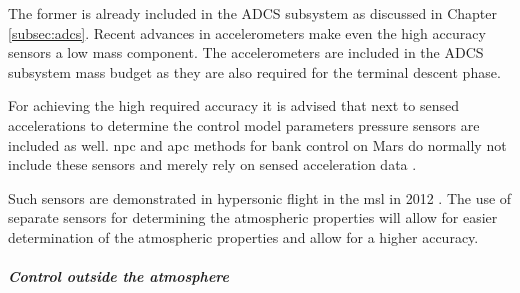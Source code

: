 The former is already included in the ADCS subsystem as discussed in Chapter \ref{subsec:adcs}. Recent advances in accelerometers make even the high accuracy sensors a low mass component. The accelerometers are included in the ADCS subsystem mass budget as they are also required for the terminal descent phase. 

For achieving the high required accuracy it is advised that next to sensed accelerations to determine the control model parameters pressure sensors are included as well.  \gls{npc} and \gls{apc} methods for bank control on Mars do normally not include these sensors and merely rely on sensed acceleration data \cite{Lu2007, Davis2010}. 
 
Such sensors are demonstrated in hypersonic flight in the \gls{msl} in 2012 \cite{Dutta2013}. The use of separate sensors for determining the atmospheric properties will allow for easier determination of the atmospheric properties and allow for a higher accuracy. 

\subparagraph{Control outside the atmosphere}


